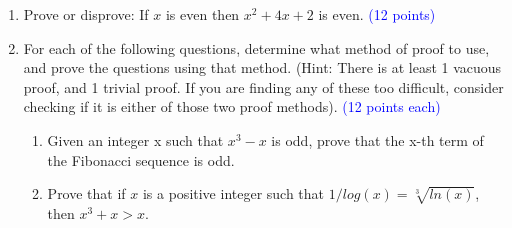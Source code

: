\documentclass{article}
\newcommand{\pt}[1]{\textcolor{blue}{(#1 points)}}
\newcommand{\pte}[1]{\textcolor{blue}{(#1 points each)}}
\begin{document}
\begin{enumerate}
    \iffalse
    \item{$a_0 = 1, a_1 = 4, a_2 = 16, a_4 = 64, a_{t} = a_{t-1} + a_{t-2} + a_{t-3} + a_{t-4}, t \in \mathbb{Z}^{\geq 4}$. Prove that $a_n \leq 4^n$ for all $n \geq 0$.} \pt{12}
    \fi
    
    \item Prove or disprove: If $x$ is even then $x^2 + 4x + 2$ is even. \pt{12}
    
    \item For each of the following questions, determine what method of proof to use, and prove the questions using that method. (Hint: There is at least 1 vacuous proof, and 1 trivial proof. If you are finding any of these too difficult, consider checking if it is either of those two proof methods). \pte{12}
    \begin{enumerate}
        \item Given an integer x such that $x^3 - x$ is odd, prove that the x-th term of the Fibonacci sequence is odd.
        \item Prove that if $x$ is a positive integer such that $1/log(x) = \sqrt[3]{ln(x)}$, then $x^3 +x > x$.
    \end{enumerate}
   
\end{enumerate}
\end{document}
